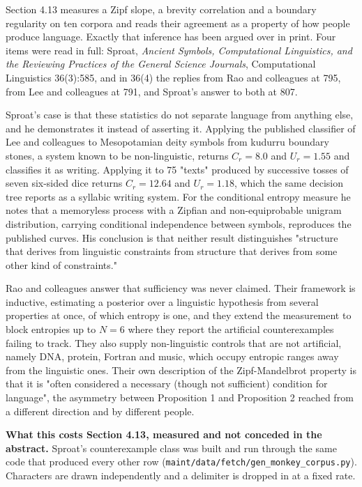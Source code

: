 Section 4.13 measures a Zipf slope, a brevity correlation and a boundary regularity on ten corpora and reads their agreement as a property of how people produce language. Exactly that inference has been argued over in print. Four items were read in full: Sproat, \emph{Ancient Symbols, Computational Linguistics, and the Reviewing Practices of the General Science Journals}, Computational Linguistics 36(3):585, and in 36(4) the replies from Rao and colleagues at 795, from Lee and colleagues at 791, and Sproat's answer to both at 807.

Sproat's case is that these statistics do not separate language from anything else, and he demonstrates it instead of asserting it. Applying the published classifier of Lee and colleagues to Mesopotamian deity symbols from kudurru boundary stones, a system known to be non-linguistic, returns \(C_r = 8.0\) and \(U_r = 1.55\) and classifies it as writing. Applying it to 75 "texts" produced by successive tosses of seven six-sided dice returns \(C_r = 12.64\) and \(U_r = 1.18\), which the same decision tree reports as a syllabic writing system. For the conditional entropy measure he notes that a memoryless process with a Zipfian and non-equiprobable unigram distribution, carrying conditional independence between symbols, reproduces the published curves. His conclusion is that neither result distinguishes "structure that derives from linguistic constraints from structure that derives from some other kind of constraints."

Rao and colleagues answer that sufficiency was never claimed. Their framework is inductive, estimating a posterior over a linguistic hypothesis from several properties at once, of which entropy is one, and they extend the measurement to block entropies up to \(N = 6\) where they report the artificial counterexamples failing to track. They also supply non-linguistic controls that are not artificial, namely DNA, protein, Fortran and music, which occupy entropic ranges away from the linguistic ones. Their own description of the Zipf-Mandelbrot property is that it is "often considered a necessary (though not sufficient) condition for language", the asymmetry between Proposition 1 and Proposition 2 reached from a different direction and by different people.

\noindent\textbf{What this costs Section 4.13, measured and not conceded in the abstract.} Sproat's counterexample class was built and run through the same code that produced every other row (\texttt{maint/\allowbreak{}data/\allowbreak{}fetch/\allowbreak{}gen\_\allowbreak{}monkey\_\allowbreak{}corpus.\allowbreak{}py}). Characters are drawn independently and a delimiter is dropped in at a fixed rate.

